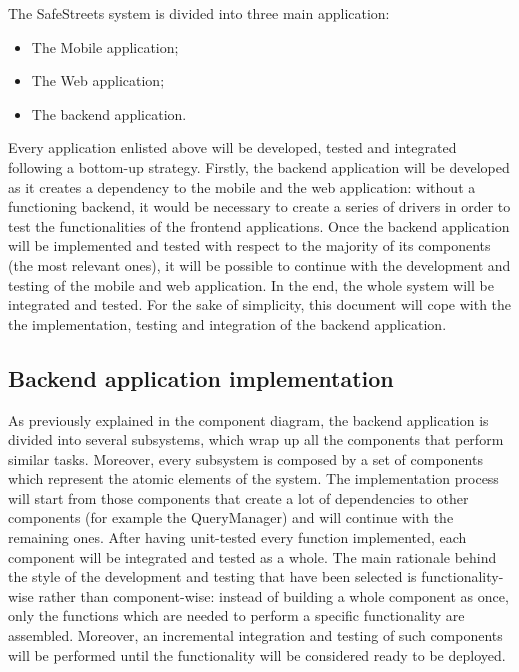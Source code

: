 The SafeStreets system is divided into three main application:
\begin{itemize}
    \item The Mobile application;
    \item The Web application;
    \item The backend application.
\end{itemize}
Every application enlisted above will be developed, tested and integrated following a bottom-up strategy. Firstly, the backend application will be developed as it creates a dependency to the mobile and the web application: without a functioning backend, it would be necessary to create a series of drivers in order to test the functionalities of the frontend applications. Once the backend application will be implemented and tested with respect to the majority of its components (the most relevant ones), it will be possible to continue with the development and testing of the mobile and web application. In the end, the whole system will be integrated and tested.
For the sake of simplicity, this document will cope with the the implementation, testing and integration of the backend application.
\subsection{Backend application implementation}
As previously explained in the component diagram, the backend application is divided into several subsystems, which wrap up all the components that perform similar tasks. Moreover, every subsystem is composed by a set of components which represent the atomic elements of the system.
The implementation process will start from those components that create a lot of dependencies to other components (for example the QueryManager) and will continue with the remaining ones. After having unit-tested every function implemented, each component will be integrated and tested as a whole. 
The main rationale behind the style of the development and testing that have been selected is functionality-wise rather than component-wise: instead of building a whole component as once, only the functions which are needed to perform a specific functionality are assembled. Moreover, an incremental integration and testing of such components will be performed until the functionality will be considered ready to be deployed.

